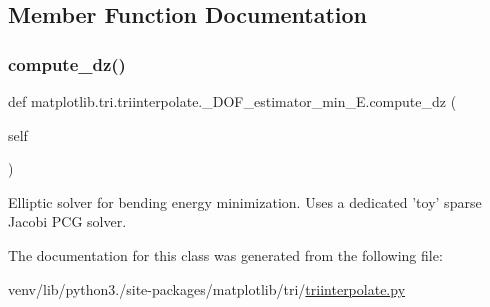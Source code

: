 \subsection{Member Function Documentation}
\mbox{\label{classmatplotlib_1_1tri_1_1triinterpolate_1_1__DOF__estimator__min__E_a2b227263b9ef56813ce3b68d754385af}} 
\subsubsection{\texorpdfstring{compute\+\_\+dz()}{compute\_dz()}}
{\footnotesize\ttfamily def matplotlib.\+tri.\+triinterpolate.\+\_\+\+D\+O\+F\+\_\+estimator\+\_\+min\+\_\+\+E.\+compute\+\_\+dz (\begin{DoxyParamCaption}\item[{}]{self }\end{DoxyParamCaption})}

\begin{DoxyVerb}Elliptic solver for bending energy minimization.
Uses a dedicated 'toy' sparse Jacobi PCG solver.
\end{DoxyVerb}
 

The documentation for this class was generated from the following file\+:\begin{DoxyCompactItemize}
\item 
venv/lib/python3./site-\/packages/matplotlib/tri/\hyperlink{triinterpolate_8py}{triinterpolate.\+py}\end{DoxyCompactItemize}
